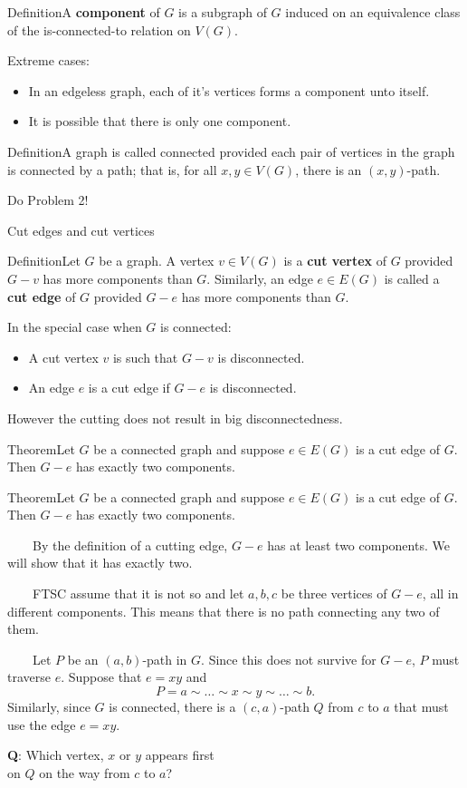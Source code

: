 \documentclass{beamer}
\def\bl[#1]#2{\begin{block}{#1}#2\end{block}}
\def\itemb{\begin{itemize}}
\def\iteme{\end{itemize}}
\begin{document}
\begin{frame}
\bl[Definition]{A \textbf{component} of $G$ is a subgraph of $G$ induced on an equivalence class of the is-connected-to relation on $V(G)$.}
Extreme cases:
\itemb
\item In an edgeless graph, each of it's vertices forms a component unto itself.
\item It is possible that there is only one component.
\iteme

\bl[Definition]{A graph is called connected provided each pair of vertices in the graph is connected by a path; that is, for all $x,y\in V(G)$, there is an $(x,y)$-path.}
\begin{center}
Do Problem 2!
\end{center}
\end{frame}

\begin{frame}{Cut edges and cut vertices}
\bl[Definition]{Let $G$ be a graph. A vertex $v\in V(G)$ is a \textbf{cut vertex} of $G$ provided $G-v$ has more components than $G$. Similarly, an edge $e\in E(G)$ is called a \textbf{cut edge} of $G$ provided $G-e$ has more components than $G$.}
In the special case when $G$ is connected:
\itemb
\item A cut vertex $v$ is such that $G-v$ is disconnected.
\item An edge $e$ is a cut edge if $G-e$ is disconnected.
\iteme
However the cutting does not result in big disconnectedness.
\bl[Theorem]{Let $G$ be a connected graph and suppose $e\in E(G)$ is a cut edge of $G$. Then $G-e$ has exactly two components.} 
\end{frame}

\begin{frame}
\bl[Theorem]{Let $G$ be a connected graph and suppose $e\in E(G)$ is a cut edge of $G$. Then $G-e$ has exactly two components.} 
~~~~By the definition of a cutting edge, $G-e$ has at least two components. We will show that it has exactly two. 

~~~~FTSC assume that it is not so and let $a,b,c$ be three vertices of $G-e$, all in different components. This means that there is no path connecting any two of them.

~~~~Let $P$ be an $(a,b)$-path in $G$. Since this does not survive for $G-e$, $P$ must traverse $e$. Suppose that $e=xy$ and
\[
P=a\sim\dots\sim x\sim y\sim\dots\sim b.
\]
Similarly, since $G$ is connected, there is a $(c,a)$-path $Q$ from $c$ to $a$ that must use the edge $e=xy$. 

\center\textbf{Q}: Which vertex, $x$ or $y$ appears first \\ on $Q$ on the way from $c$ to $a$?
\end{frame}
\end{document}
